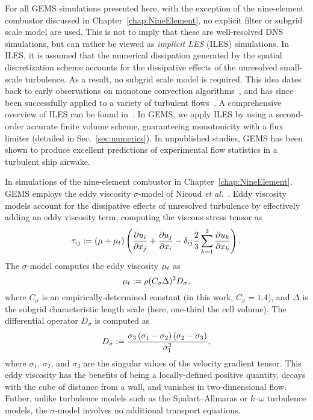 For all GEMS simulations presented here, with the exception of the nine-element combustor discussed in Chapter~\ref{chap:NineElement}, no explicit filter or subgrid scale model are used. This is not to imply that these are well-resolved DNS simulations, but can rather be viewed as \textit{implicit LES} (ILES) simulations. In ILES, it is assumed that the numerical dissipation generated by the spatial discretization scheme accounts for the dissipative effects of the unresolved small-scale turbulence. As a result, no subgrid scale model is required. This idea dates back to early observations on monotone convection algorithms~\cite{Boris1989}, and has since been successfully applied to a variety of turbulent flows~\cite{Porter1994,Grinstein2005,Bensow2010}. A comprehensive overview of ILES can be found in~\cite{ilesBook}. In GEMS, we apply ILES by using a second-order accurate finite volume scheme, guaranteeing monotonicity with a flux limiter (detailed in Sec.~\ref{sec:numerics}). In unpublished studies, GEMS has been shown to produce excellent predictions of experimental flow statistics in a turbulent ship airwake.

In simulations of the nine-element combustor in Chapter~\ref{chap:NineElement}, GEMS employs the eddy viscosity $\sigma$-model of Nicoud \textit{et al.}~\cite{Nicoud2011}. Eddy viscosity models account for the dissipative effects of unresolved turbulence by effectively adding an eddy viscosity term, computing the viscous stress tensor as
%
\begin{equation}
	\tau_{i j} := \left(\mu + \mu_{t}\right) \left( \frac{\partial u_{i}}{\partial x_{j}} + \frac{\partial u_{j}}{\partial x_{i}} - \delta_{i j} \frac{2}{3} \sum_{k=1}^3 \frac{\partial u_{k}}{\partial x_{k}} \right).
\end{equation}
%
The $\sigma$-model computes the eddy viscosity $\mu_{t}$ as
%
\begin{equation}
	\mu_{t} := \rho (C_{\sigma} \Delta)^2 D_{\sigma},
\end{equation}
%
where $C_{\sigma}$ is an empirically-determined constant (in this work, $C_{\sigma} = 1.4$), and $\Delta$ is the subgrid characteristic length scale (here, one-third the cell volume). The differential operator $D_{\sigma}$ is computed as
%
\begin{equation}
	D_{\sigma} := \frac{\sigma_3\left(\sigma_1 - \sigma_2\right)\left(\sigma_2 - \sigma_3\right)}{\sigma_1^2},
\end{equation}
%
where $\sigma_1$, $\sigma_2$, and $\sigma_3$ are the singular values of the velocity gradient tensor. This eddy viscosity has the benefits of being a locally-defined positive quantity, decays with the cube of distance from a wall, and vanishes in two-dimensional flow. Futher, unlike turbulence models such as the Spalart--Allmaras or $k$--$\omega$ turbulence models, the $\sigma$-model involves no additional transport equations.


